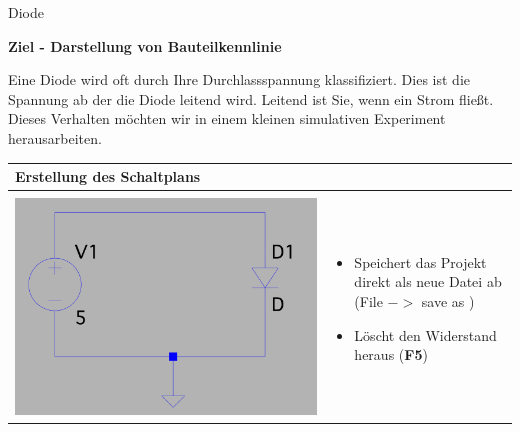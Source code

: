 \begin{frame}[t]{Diode}

    \textbf{Ziel - Darstellung von Bauteilkennlinie}
    
    \begin{spacing}{0.6} \begin{tiny}
    
    Eine Diode wird oft durch Ihre Durchlassspannung klassifiziert. Dies ist die Spannung ab der die Diode leitend wird. Leitend ist Sie, wenn ein Strom fließt. Dieses Verhalten möchten
    wir in einem kleinen simulativen Experiment herausarbeiten. 
    \end{tiny} \end{spacing}
    \begin{spacing}{0.9} \begin{tiny}
    \begin{table}[h!]
      \begin{tabular}{p{3cm} p{7cm}}
        \hline
        \textbf{Erstellung des Schaltplans} & \\
        \hline \\
        \begin{minipage}{.3\textwidth}
          \includegraphics[width=\linewidth]{pictures/diode.png}
        \end{minipage} 
        & 
        \begin{minipage}{.7\textwidth}
        \begin{itemize}
          \item Speichert das Projekt direkt als neue Datei ab (File $->$ save as ) 
          \item Löscht den Widerstand heraus (\textbf{F5}) 

\end{itemize}
\end{minipage}
\end{tabular}
\end{table}
\end{tiny}
\end{spacing}
\end{frame}
